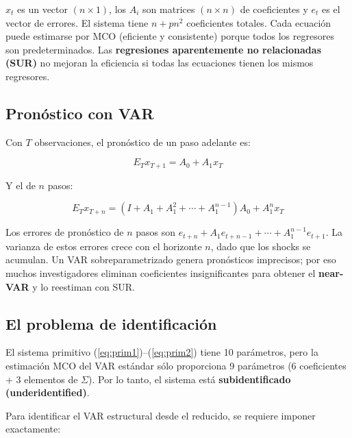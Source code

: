 \documentclass[12pt]{article}
\begin{document}
\begin{intuicionmat}
$x_t$ es un vector $(n \times 1)$, los $A_i$ son matrices $(n \times n)$ de coeficientes y $e_t$ es el vector de errores. El sistema tiene $n + pn^2$ coeficientes totales. Cada ecuaci\'on puede estimarse por MCO (eficiente y consistente) porque todos los regresores son predeterminados. Las \textbf{regresiones aparentemente no relacionadas (SUR)} no mejoran la eficiencia si todas las ecuaciones tienen los mismos regresores.
\end{intuicionmat}

\subsection{Pron\'ostico con VAR}

Con $T$ observaciones, el pron\'ostico de un paso adelante es:

\begin{equation}
E_T x_{T+1} = A_0 + A_1 x_T
\end{equation}

Y el de $n$ pasos:

\begin{equation}
E_T x_{T+n} = (I + A_1 + A_1^2 + \cdots + A_1^{n-1})A_0 + A_1^n x_T
\end{equation}

\begin{intuicionmat}
Los errores de pron\'ostico de $n$ pasos son $e_{t+n} + A_1 e_{t+n-1} + \cdots + A_1^{n-1}e_{t+1}$. La varianza de estos errores crece con el horizonte $n$, dado que los shocks se acumulan. Un VAR sobreparametrizado genera pron\'osticos imprecisos; por eso muchos investigadores eliminan coeficientes insignificantes para obtener el \textbf{near-VAR} y lo reestiman con SUR.
\end{intuicionmat}

\subsection{El problema de identificaci\'on}

El sistema primitivo (\ref{eq:prim1})--(\ref{eq:prim2}) tiene 10 par\'ametros, pero la estimaci\'on MCO del VAR est\'andar s\'olo proporciona 9 par\'ametros (6 coeficientes + 3 elementos de $\Sigma$). Por lo tanto, el sistema est\'a \textbf{subidentificado (underidentified)}.

Para identificar el VAR estructural desde el reducido, se requiere imponer exactamente:
\end{document}
